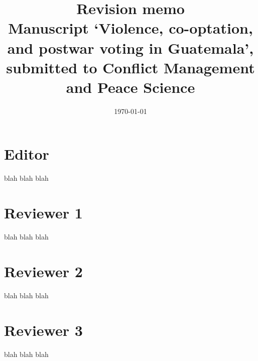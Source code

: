 \documentclass[12pt, a4paper, notitlepage]{article}
\title{\Large \textbf{Revision memo}\\{\large Manuscript `Violence, co-optation, and postwar voting in Guatemala', submitted to Conflict Management and Peace Science}}
\date{\today}
\begin{document}
\maketitle

\newpage
\section*{Editor}

\begin{displayquote}
blah blah blah
\end{displayquote}

\newpage
\section*{Reviewer 1}

\begin{displayquote}
blah blah blah
\end{displayquote}

\newpage
\section*{Reviewer 2}

\begin{displayquote}
blah blah blah
\end{displayquote}

\newpage
\section*{Reviewer 3}

\begin{displayquote}
blah blah blah
\end{displayquote}
\end{document}

